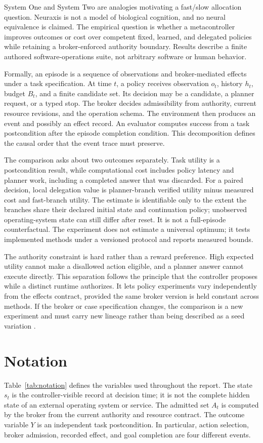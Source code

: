 \documentclass[11pt]{article}
\begin{document}
System One and System Two are analogies motivating a fast/slow allocation question. Neuraxis is not a model of biological cognition, and no neural equivalence is claimed. The empirical question is whether a metacontroller improves outcomes or cost over competent fixed, learned, and delegated policies while retaining a broker-enforced authority boundary. Results describe a finite authored software-operations suite, not arbitrary software or human behavior.

Formally, an episode is a sequence of observations and broker-mediated effects under a task specification. At time $t$, a policy receives observation $o_t$, history $h_t$, budget $B_t$, and a finite candidate set. Its decision may be a candidate, a planner request, or a typed stop. The broker decides admissibility from authority, current resource revisions, and the operation schema. The environment then produces an event and possibly an effect record. An evaluator computes success from a task postcondition after the episode completion condition. This decomposition defines the causal order that the event trace must preserve.

The comparison asks about two outcomes separately. Task utility is a postcondition result, while computational cost includes policy latency and planner work, including a completed answer that was discarded. For a paired decision, local delegation value is planner-branch verified utility minus measured cost and fast-branch utility. The estimate is identifiable only to the extent the branches share their declared initial state and continuation policy; unobserved operating-system state can still differ after reset. It is not a full-episode counterfactual. The experiment does not estimate a universal optimum; it tests implemented methods under a versioned protocol and reports measured bounds.

The authority constraint is hard rather than a reward preference. High expected utility cannot make a disallowed action eligible, and a planner answer cannot execute directly. This separation follows the principle that the controller proposes while a distinct runtime authorizes. It lets policy experiments vary independently from the effects contract, provided the same broker version is held constant across methods. If the broker or case specification changes, the comparison is a new experiment and must carry new lineage rather than being described as a seed variation \cite{hadfieldmenell2016,amodei2016,leike2018}.
\section{Notation}
Table~\ref{tab:notation} defines the variables used throughout the report. The state $s_t$ is the controller-visible record at decision time; it is not the complete hidden state of an external operating system or service. The admitted set $A_t$ is computed by the broker from the current authority and resource contract. The outcome variable $Y$ is an independent task postcondition. In particular, action selection, broker admission, recorded effect, and goal completion are four different events.
\end{document}
